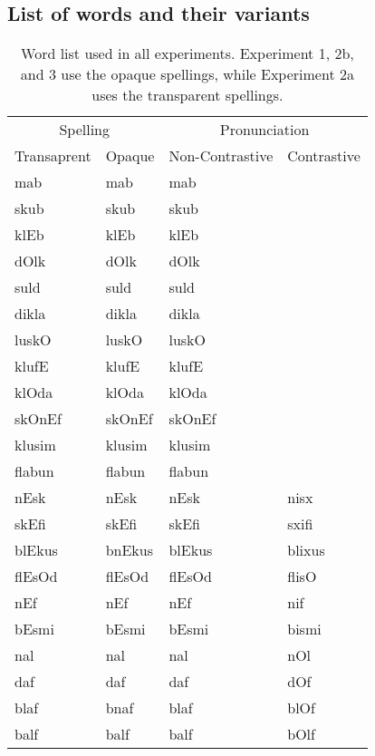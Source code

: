 \documentclass[doc,floatsintext]{apa6}
\begin{document}
\begin{appendix}
\section{}
\subsection{List of words and their variants}\label{appendix-c}

\begin{table}[!h]

\caption{\label{tab:unnamed-chunk-12}Word list used in all experiments. Experiment 1, 2b, and 3 use the opaque spellings, while Experiment 2a uses the transparent spellings.}
\centering
\fontsize{8}{10}\selectfont
\begin{tabular}{llll}
\toprule
\multicolumn{2}{c}{Spelling} & \multicolumn{2}{c}{Pronunciation} \\
\cmidrule(l{3pt}r{3pt}){1-2} \cmidrule(l{3pt}r{3pt}){3-4}
Transaprent & Opaque & Non-Contrastive & Contrastive\\
\midrule
mab & mab & mab & \\
skub & skub & skub & \\
klEb & klEb & klEb & \\
dOlk & dOlk & dOlk & \\
suld & suld & suld & \\
dikla & dikla & dikla & \\
luskO & luskO & luskO & \\
klufE & klufE & klufE & \\
klOda & klOda & klOda & \\
skOnEf & skOnEf & skOnEf & \\
klusim & klusim & klusim & \\
flabun & flabun & flabun & \\
nEsk & nEsk & nEsk & nisx\\
skEfi & skEfi & skEfi & sxifi\\
blEkus & bnEkus & blEkus & blixus\\
flEsOd & flEsOd & flEsOd & flisO\\
nEf & nEf & nEf & nif\\
bEsmi & bEsmi & bEsmi & bismi\\
nal & nal & nal & nOl\\
daf & daf & daf & dOf\\
blaf & bnaf & blaf & blOf\\
balf & balf & balf & bOlf\\

\end{tabular}
\end{table}
\end{appendix}
\end{document}
